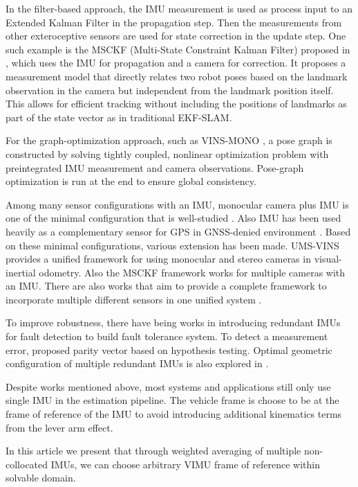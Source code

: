 \documentclass[conference]{IEEEtran}
\begin{document}
In the filter-based approach, the IMU measurement is used as process input to an Extended Kalman Filter in the propagation step. Then the measurements from other exteroceptive sensors are used for state correction in the update step. One such example is the MSCKF (Multi-State Constraint Kalman Filter) proposed in \cite{Anastasios2007_MSCKF}, which uses the IMU for propagation and a camera for correction. It proposes a measurement model that directly relates two robot poses based on the landmark observation in the camera but independent from the landmark position itself. This allows for efficient tracking without including the positions of landmarks as part of the state vector as in traditional EKF-SLAM.

For the graph-optimization approach, such as VINS-MONO \cite{qin2018_vins-mono}, a pose graph is constructed by solving tightly coupled, nonlinear optimization problem with preintegrated IMU measurement and camera observations. Pose-graph optimization is run at the end to ensure global consistency.

Among many sensor configurations with an IMU, monocular camera plus IMU is one of the minimal configuration that is well-studied \cite{qin2018_vins-mono, 10616216}. Also IMU has been used heavily as a complementary sensor for GPS in GNSS-denied environment \cite{1008998, 8987949}. Based on these minimal configurations, various extension has been made. UMS-VINS \cite{jiang2023_UMS-VINS} provides a unified framework for using monocular and stereo cameras in visual-inertial odometry. Also the MSCKF framework \cite{Anastasios2007_MSCKF} works for multiple cameras with an IMU. There are also works that aim to provide a complete framework to incorporate multiple different sensors in one unified system \cite{10587194}.

To improve robustness, there have being works in introducing redundant IMUs for fault detection to build fault tolerance system. To detect a measurement error, \cite{Sturza1988_redundant} proposed parity vector based on hypothesis testing. Optimal geometric configuration of multiple redundant IMUs is also explored in \cite{Colomina2004REDUNDANTIF, guerrier2009, xue2023}.

Despite works mentioned above, most systems and applications still only use single IMU in the estimation pipeline. The vehicle frame is choose to be at the frame of reference of the IMU to avoid introducing additional kinematics terms from the lever arm effect.

In this article we present that through weighted averaging of multiple non-collocated IMUs, we can choose arbitrary VIMU frame of reference within solvable domain.
\end{document}
